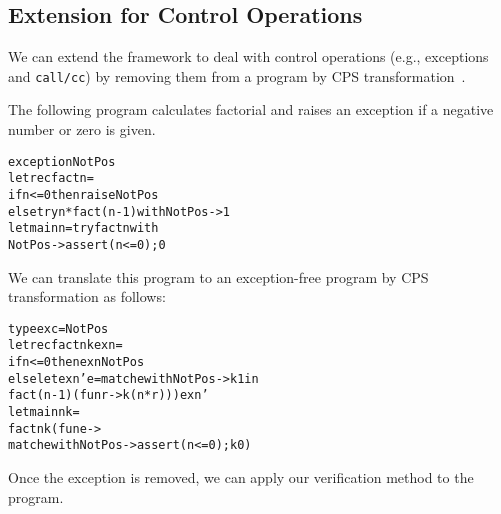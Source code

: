 \subsection{Extension for Control Operations}
\label{sec:control} We can extend the framework to deal with control
operations (e.g., exceptions and \texttt{call/cc}) by removing them
from a program by CPS transformation~\cite{Nielsen2001}.

The following program calculates factorial and raises an exception if
a negative number or zero is given.
\begin{alltt}
exception NotPos
let rec fact n =
  if n <= 0 then raise NotPos
  else try n * fact (n - 1) with NotPos -> 1
let main n = try fact n with
               NotPos -> assert (n <= 0); 0
\end{alltt}
We can translate this program to an exception-free program by CPS transformation as follows:
\begin{alltt}
type exc = NotPos
let rec fact n k exn =
  if n <= 0 then exn NotPos
  else let exn' e = match e with NotPos -> k 1 in
         fact (n - 1) (fun r -> k (n * r))) exn'
let main n k =
  fact n k (fun e ->
    match e with NotPos -> assert (n <= 0); k 0)
\end{alltt}
Once the exception is removed, we can apply our verification method to the
program.
